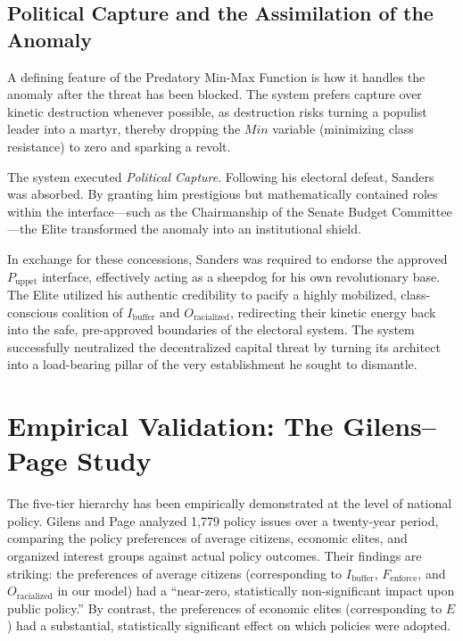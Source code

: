 \subsection{Political Capture and the Assimilation of the Anomaly}

A defining feature of the Predatory Min-Max Function is how it handles the anomaly after the threat has been blocked. The system prefers capture over kinetic destruction whenever possible, as destruction risks turning a populist leader into a martyr, thereby dropping the $Min$ variable (minimizing class resistance) to zero and sparking a revolt.

The system executed \textit{Political Capture}. Following his electoral defeat, Sanders was absorbed. By granting him prestigious but mathematically contained roles within the interface---such as the Chairmanship of the Senate Budget Committee---the Elite transformed the anomaly into an institutional shield.

In exchange for these concessions, Sanders was required to endorse the approved $P_{\text{uppet}}$ interface, effectively acting as a sheepdog for his own revolutionary base. The Elite utilized his authentic credibility to pacify a highly mobilized, class-conscious coalition of $I_{\text{buffer}}$ and $O_{\text{racialized}}$, redirecting their kinetic energy back into the safe, pre-approved boundaries of the electoral system. The system successfully neutralized the decentralized capital threat by turning its architect into a load-bearing pillar of the very establishment he sought to dismantle.

\section{Empirical Validation: The Gilens--Page Study}
\label{sec:gilens_page}

The five-tier hierarchy has been empirically demonstrated at the level of national policy. Gilens and Page \cite{gilens} analyzed 1,779 policy issues over a twenty-year period, comparing the policy preferences of average citizens, economic elites, and organized interest groups against actual policy outcomes. Their findings are striking: the preferences of average citizens (corresponding to $I_{\text{buffer}}$, $F_{\text{enforce}}$, and $O_{\text{racialized}}$ in our model) had a ``near-zero, statistically non-significant impact upon public policy.'' By contrast, the preferences of economic elites (corresponding to $E$) had a substantial, statistically significant effect on which policies were adopted.

